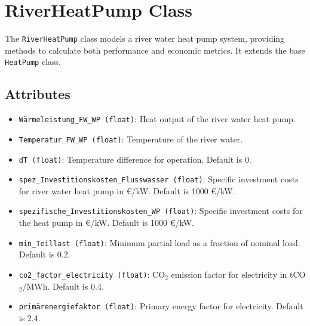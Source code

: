 \section{RiverHeatPump Class}
The \texttt{RiverHeatPump} class models a river water heat pump system, providing methods to calculate both performance and economic metrics. It extends the base \texttt{HeatPump} class.

\subsection{Attributes}
\begin{itemize}
    \item \texttt{Wärmeleistung\_FW\_WP (float)}: Heat output of the river water heat pump.
    \item \texttt{Temperatur\_FW\_WP (float)}: Temperature of the river water.
    \item \texttt{dT (float)}: Temperature difference for operation. Default is 0.
    \item \texttt{spez\_Investitionskosten\_Flusswasser (float)}: Specific investment costs for river water heat pump in €/kW. Default is 1000 €/kW.
    \item \texttt{spezifische\_Investitionskosten\_WP (float)}: Specific investment costs for the heat pump in €/kW. Default is 1000 €/kW.
    \item \texttt{min\_Teillast (float)}: Minimum partial load as a fraction of nominal load. Default is 0.2.
    \item \texttt{co2\_factor\_electricity (float)}: CO$_2$ emission factor for electricity in tCO$_2$/MWh. Default is 0.4.
    \item \texttt{primärenergiefaktor (float)}: Primary energy factor for electricity. Default is 2.4.
\end{itemize}

